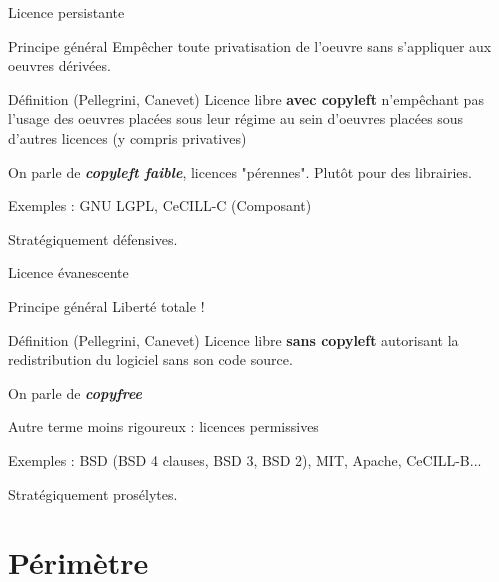 \documentclass{beamer}
\begin{document}
\begin{frame}{Licence persistante}

\begin{block}{Principe général}
    Empêcher toute privatisation de l'oeuvre sans s'appliquer aux oeuvres dérivées.
  \end{block}

  \begin{alertblock}{Définition (Pellegrini, Canevet)}
    Licence libre \textbf{avec copyleft} n'empêchant pas l'usage des oeuvres placées sous leur régime au sein d'oeuvres placées sous d'autres licences (y compris privatives)
   \end{alertblock}

On parle de \textit{\textbf{copyleft faible}}, licences "pérennes". Plutôt pour des librairies.
 
Exemples : GNU LGPL, CeCILL-C (Composant)

Stratégiquement défensives.

\end{frame}


\begin{frame}{Licence évanescente}

  \begin{block}{Principe général}
    Liberté totale !
  \end{block}

  \begin{alertblock}{Définition (Pellegrini, Canevet)}
    Licence libre \textbf{sans copyleft} autorisant la redistribution du logiciel sans son code source.
   \end{alertblock}

On parle de \textit{\textbf{copyfree}}

Autre terme moins rigoureux : licences permissives 

Exemples : BSD (BSD 4 clauses, BSD 3, BSD 2), MIT, Apache, CeCILL-B... 

Stratégiquement prosélytes.

\end{frame}

\section{Périmètre}
\end{document}
